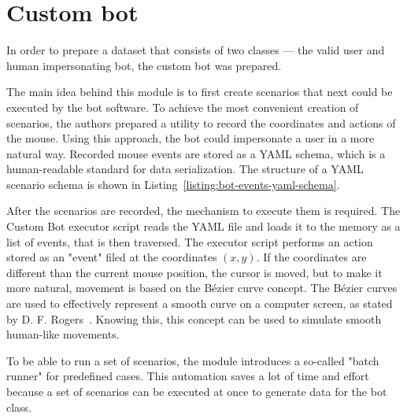 \section{Custom bot}\label{sec:custom-bot}
In order to prepare a dataset that consists of two classes --- the valid user and human impersonating bot, the custom bot was prepared.

The main idea behind this module is to first create scenarios that next could be executed by the bot software.
To achieve the most convenient creation of scenarios, the authors prepared a utility to record the coordinates and actions of the mouse.
Using this approach, the bot could impersonate a user in a more natural way.
Recorded mouse events are stored as a YAML schema, which is a human-readable standard for data serialization.
The structure of a YAML scenario schema is shown in Listing~\ref{listing:bot-events-yaml-schema}.



After the scenarios are recorded, the mechanism to execute them is required.
The Custom Bot executor script reads the YAML file and loads it to the memory as a list of events, that is then traversed.
The executor script performs an action stored as an "event" filed at the coordinates $(x, y)$.
If the coordinates are different than the current mouse position, the cursor is moved, but to make it more natural, movement is based on the Bézier curve concept.
The Bézier curves are used to effectively represent a smooth curve on a computer screen, as stated by D. F. Rogers~\cite{bezier-curves}. Knowing this, this concept can be used to simulate smooth human-like movements.

To be able to run a set of scenarios, the module introduces a so-called "batch runner" for predefined cases.
This automation saves a lot of time and effort because a set of scenarios can be executed at once to generate data for the bot class.

